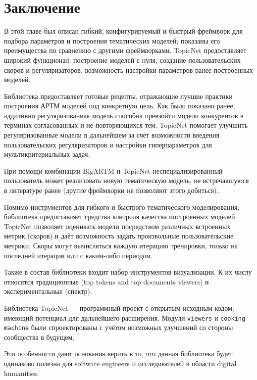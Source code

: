 

\section{Заключение}

В этой главе был описан гибкий, конфигурируемый и быстрый фреймворк для подбора параметров и построения тематических моделей; показаны его преимущества по сравнению с другими фреймворками. TopicNet предоставляет широкий функционал: построение моделей с нуля, создание пользовательских скоров и регуляризаторов, возможность настройки параметров ранее построенных моделей.  

Библиотека предоставляет готовые рецепты, отражающие лучшие практики построения АРТМ моделей под конкретную цель. Как было показано ранее, аддитивно регуляризованная модель способна превзойти модели конкурентов в терминах согласованных и не-повторяющихся тем. TopicNet помогает улучшить регуляризованные модели в дальнейшем за счёт возможности введения пользовательских регуляризаторов и настройки гиперпараметров для мультикритериальных задач.  

При помощи комбинации BigARTM и TopicNet неспециализированный пользователь может реализовать новую тематическую модель, не встречавшуюся в литературе ранее (другие фреймворки не позволяют этого добиться).  

Помимо инструментов для гибкого и быстрого тематического моделирования, библиотека предоставляет средства контроля качества построенных моделей. TopicNet позволяет оценивать модели посредством различных встроенных метрик (скоров) и даёт возможность задать произвольные пользовательские метрики. Скоры могут вычисляться каждую итерацию тренировки, только на последней итерации или с каким-либо периодом.  

Также в состав библиотеки входит набор инструментов визуализации. К их числу относятся традиционные (top tokens and top documents viewers) и экспериментальные (спектр).  

Библиотека TopicNet --- программный проект с открытым исходным кодом, имеющий потенциал для дальнейшего расширения. Модули \texttt{viewers} и \texttt{cooking machine} были спроектированы с учётом возможных улучшений со стороны сообщества в будущем.  

Эти особенности дают основания верить в то, что данная библиотека будет одинаково полезна для software engineers и исследователей в области digital humanities.  


